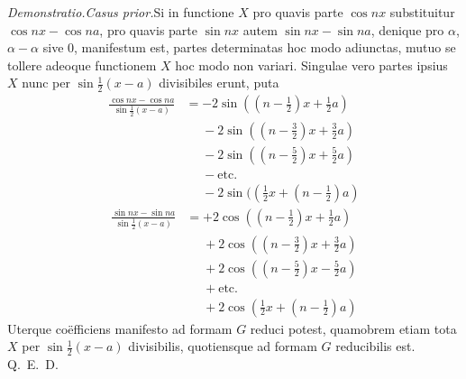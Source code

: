 \textit{Demonstratio.\quad Casus prior.}\quad Si in functione $X$ pro quavis parte $\cos nx$ substituitur $\cos nx-\cos na$, pro quavis parte $\sin nx$ autem $\sin nx-\sin na$,
denique pro $\alpha$, $\alpha-\alpha$ sive $0$, manifestum est, partes determinatas hoc modo adiunctas, mutuo se tollere adeoque functionem $X$ hoc modo non variari. Singulae vero partes ipsius $X$ nunc per $\sin\tfrac12(x-a)$ divisibiles erunt, puta
\[
\begin{aligned}
\frac{\cos nx-\cos na}{\sin\tfrac12(x-a)}
&=-2\sin((n-\tfrac12)x+\tfrac12a)\\[5pt]
&\phantom{=}{-}2\sin((n-\tfrac32)x+\tfrac32a)\\[5pt]
&\phantom{=}{-}2\sin((n-\tfrac52)x+\tfrac52a)\\[5pt]
&\phantom{=}{-}\text{etc.}\\[5pt]
&\phantom{=}{-}2\sin((\tfrac12x+(n-\tfrac12)a)
\end{aligned}
\]
\[
\begin{aligned}
\frac{\sin nx-\sin na}{\sin\tfrac12(x-a)}
&=+2\cos((n-\tfrac12)x+\tfrac12a)\\[5pt]
&\phantom{=}{+}2\cos((n-\tfrac32)x+\tfrac32a)\\[5pt]
&\phantom{=}{+}2\cos((n-\tfrac52)x-\tfrac52a)\\[5pt]
&\phantom{=}{+}\text{etc.}\\[5pt]
&\phantom{=}{+}2\cos(\tfrac12x+(n-\tfrac12)a)
\end{aligned}
\]
Uterque coëfficiens manifesto ad formam $G$ reduci potest, quamobrem etiam tota $X$ per $\sin\tfrac12(x-a)$ divisibilis, quotiensque ad formam $G$ reducibilis est. Q.~E.~D.

